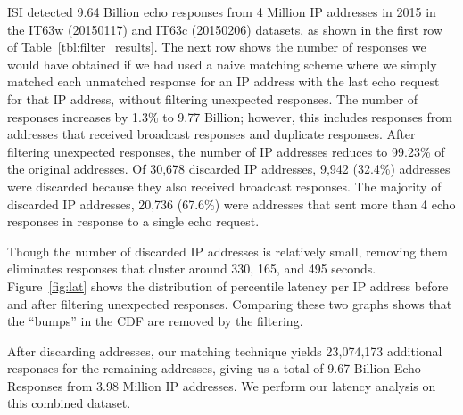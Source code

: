 \begin{figure*}[tb]
\begin{center}
\hspace{0.2in}
\end{center}
\caption{CDF of Percentile latency per IP address before and after filtering
  unexpected responses. Each point represents an IP address and each
  color represents the percentile from that IP address's response
  latencies. Before filtering unexpected responses, there are
  bumps caused by broadcast responses at 330s, 165s and 495s,
  fractions of the 11 minute (660s) probing interval.
}
\label{fig:lat}
\end{figure*}


ISI detected 9.64 Billion echo responses from 4 Million IP addresses in 2015
in the IT63w (20150117) and IT63c (20150206) datasets, as shown in the
first row of Table~\ref{tbl:filter_results}.
The next row shows the number of responses we would have obtained
if we had used a naive matching scheme where we simply matched each
unmatched response for an IP address with the last echo request for
that IP
address, without filtering unexpected responses.
The number of responses
increases by 1.3\% to 9.77 Billion; however, this includes responses
from addresses that received broadcast responses and duplicate
responses. 
%
After filtering unexpected responses, the number of IP addresses
reduces to 99.23\% of
the original addresses. 
%
Of 30,678 discarded IP addresses, 9,942 (32.4\%)
addresses were discarded because they also received broadcast
responses. 
%
The majority of discarded IP addresses, 20,736 (67.6\%) were addresses that
sent more than 4 echo responses in response to a single echo request. 

Though the number of discarded IP addresses is relatively small, removing
them eliminates responses that cluster around 330, 165, and 495 seconds.
Figure~\ref{fig:lat} shows the distribution of percentile latency per
IP address before and after filtering unexpected responses.  Comparing
these two graphs shows that the ``bumps'' in the CDF are removed by the filtering.

After discarding addresses, our matching technique yields 23,074,173
additional responses for the remaining addresses, giving us a total of
9.67 Billion Echo Responses from 3.98 Million IP addresses. We perform
our latency analysis on this combined dataset.

